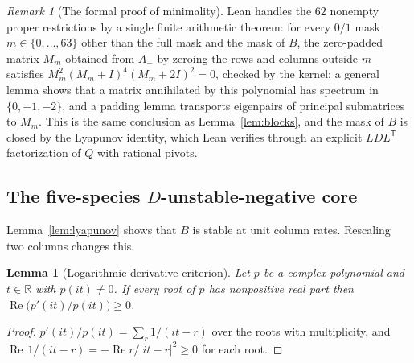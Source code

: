 \documentclass[11pt,a4paper]{article}
\theoremstyle{plain}
\newtheorem{lemma}[theorem]{Lemma}
\theoremstyle{definition}
\theoremstyle{remark}
\newtheorem{remark}[theorem]{Remark}
\newcommand{\R}{\mathbb R}
\newcommand{\Aminus}{A_{-}}
\newcommand{\T}{\mathsf T}
\DeclareMathOperator{\Ree}{Re}
\begin{document}
\begin{remark}[The formal proof of minimality]
Lean handles the $62$ nonempty proper restrictions by a single finite arithmetic theorem: for every $0/1$ mask $m\in\{0,\dots,63\}$ other than the full mask and the mask of $B$, the zero-padded matrix $M_m$ obtained from $\Aminus$ by zeroing the rows and columns outside $m$ satisfies $M_m^2(M_m+I)^4(M_m+2I)^2=0$, checked by the kernel; a general lemma shows that a matrix annihilated by this polynomial has spectrum in $\{0,-1,-2\}$, and a padding lemma transports eigenpairs of principal submatrices to $M_m$. This is the same conclusion as Lemma~\ref{lem:blocks}, and the mask of $B$ is closed by the Lyapunov identity, which Lean verifies through an explicit $LDL^{\T}$ factorization of $Q$ with rational pivots.
\end{remark}

\subsection{The five-species \texorpdfstring{$D$}{D}-unstable-negative core}\label{sec:five}
Lemma~\ref{lem:lyapunov} shows that $B$ is stable at unit column rates. Rescaling two columns changes this.

\begin{lemma}[Logarithmic-derivative criterion]\label{lem:logderivative}
Let $p$ be a complex polynomial and $t\in\R$ with $p(it)\neq0$. If every root of $p$ has nonpositive real part then $\Ree\bigl(p'(it)/p(it)\bigr)\ge0$.
\end{lemma}
\begin{proof}
$p'(it)/p(it)=\sum_r 1/(it-r)$ over the roots with multiplicity, and $\Ree\,1/(it-r)=-\Ree r/|it-r|^2\ge0$ for each root.
\end{proof}
\end{document}
